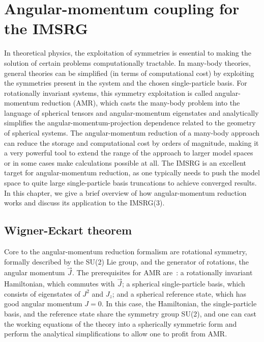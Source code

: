 \chapter{Angular-momentum coupling for the IMSRG}\label{ch:ang_mom_coupling}

In theoretical physics,
the exploitation of symmetries is essential to making
the solution of certain problems computationally tractable.
In many-body theories,
general theories can be simplified
(in terms of computational cost)
by exploiting the symmetries
present in the system and the chosen single-particle basis.
For rotationally invariant systems,
this symmetry exploitation is called angular-momentum reduction (AMR),
which casts the many-body problem
into the language of spherical tensors
and angular-momentum eigenstates
and analytically simplifies
the angular-momentum-projection dependence
related to the geometry of spherical systems.
The angular-momentum reduction of a many-body approach
can reduce the storage and computational cost by orders of magnitude,
making it a very powerful tool to extend
the range of the approach to larger model spaces
or in some cases make calculations possible at all.
The IMSRG is an excellent target for angular-momentum reduction,
as one typically needs to push the model space
to quite large single-particle basis truncations
to achieve converged results.
In this chapter,
we give a brief overview of how angular-momentum reduction works
and discuss its application
to the IMSRG(3).

\section{Wigner-Eckart theorem}\label{sec:amr}

Core to the angular-momentum reduction formalism
are rotational symmetry,
formally described by the SU(2) Lie group,
and the generator of rotations,
the angular momentum $\vec{J}$.
The prerequisites for AMR are~\cite{Tich20jcoupling}:
a rotationally invariant Hamiltonian, which commutes with $\vec{J}$;
a spherical single-particle basis, which consists of eigenstates of $J^2$ and $J_{z}$;
and a spherical reference state,
which has good angular momentum $J=0$.
In this case, the Hamiltonian, the single-particle basis,
and the reference state share the symmetry group SU(2),
and one can cast the working equations of the theory
into a spherically symmetric form
and perform the analytical simplifications
to allow one to profit from AMR.

